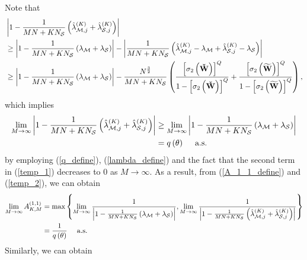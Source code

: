 \documentclass[11pt, draftclsnofoot, onecolumn]{IEEEtran}
\newcommand{\cW}{{\check{W}}}
\newcommand{\tW}{{\widetilde{W}}}
\begin{document}
\begin{IEEEproof}
Note that
\begin{align} \notag
& \left| {1 - \frac{1}{{MN + K{N_{\cal S}}}}\left( {\hat \lambda _{{\cal M},j}^{(K)} + \hat \lambda _{{\cal S},j}^{(K)}} \right)} \right| \\ \notag
&  \ge \left| {1 - \frac{1}{{MN + K{N_{\cal S}}}}\left( {{\lambda _{\cal M}} + {\lambda _{\cal S}}} \right)} \right| - \left| {\frac{1}{{MN + K{N_{\cal S}}}}\left( {\hat \lambda _{{\cal M},j}^{(K)} - {\lambda _{\cal M}} + \hat \lambda _{{\cal S},j}^{(K)} - {\lambda _{\cal S}}} \right)} \right|\\ \label{temp_1}
& \ge \left| {1 - \frac{1}{{MN + K{N_{\cal S}}}}\left( {{\lambda _{\cal M}} + {\lambda _{\cal S}}} \right)} \right| - \frac{{{N^{\frac{3}{2}}}}}{{MN + K{N_{\cal S}}}}\left( {\frac{{{{\left[ {{\sigma _2}\left( {\bf{\cW}} \right)} \right]}^Q}}}{{1 - {{\left[ {{\sigma _2}\left( {\bf{\cW}} \right)} \right]}^Q}}} + \frac{{{{\left[ {{\sigma _2}\left( {\bf{\tW}} \right)} \right]}^Q}}}{{1 - {{\left[ {{\sigma _2}\left( {\bf{\tW}} \right)} \right]}^Q}}}} \right),
\end{align}
which implies
\begin{align} \notag
\mathop {\lim }\limits_{M \to \infty } \left| {1 - \frac{1}{{MN + K{N_{\cal S}}}}\left( {\hat \lambda _{{\cal M},j}^{(K)} + \hat \lambda _{{\cal S},j}^{(K)}} \right)} \right| & \ge \mathop {\lim }\limits_{M \to \infty } \left| {1 - \frac{1}{{MN + K{N_{\cal S}}}}\left( {{\lambda _{\cal M}} + {\lambda _{\cal S}}} \right)} \right| \\ \label{temp_2}
& = q\left( \theta  \right) \quad \text{ a.s.}
\end{align}
by employing (\ref{q_define}), (\ref{lambda_define}) and the fact that the second term in (\ref{temp_1}) decreases to $0$ as $M \to \infty$. As a result, from (\ref{A_1_1_define}) and (\ref{temp_2}), we can obtain
\begin{align} \notag
\mathop {\lim }\limits_{M \to \infty } A_{K,M}^{(1,1)} & =  \max \left\{ {\mathop {\lim }\limits_{M \to \infty }\frac{1}{{\left| {1 - \frac{1}{{MN + K{N_{\cal S}}}}\left( {{\lambda _{\cal M}} + {\lambda _{\cal S}}} \right)} \right|}},\mathop {\lim }\limits_{M \to \infty }\frac{1}{{\left| {1 - \frac{1}{{MN + K{N_{\cal S}}}}\left( {\hat \lambda _{{\cal M},j}^{(K)} + \hat \lambda _{{\cal S},j}^{(K)}} \right)} \right|}}} \right\}\\ \label{limit_A_1_1}
& = \frac{1}{{q\left( \theta  \right)}} \quad \text{ a.s.}
\end{align}
Similarly, we can obtain
\begin{equation}  \label{limit_A_1_2}

\end{equation}
\end{IEEEproof}
\end{document}
